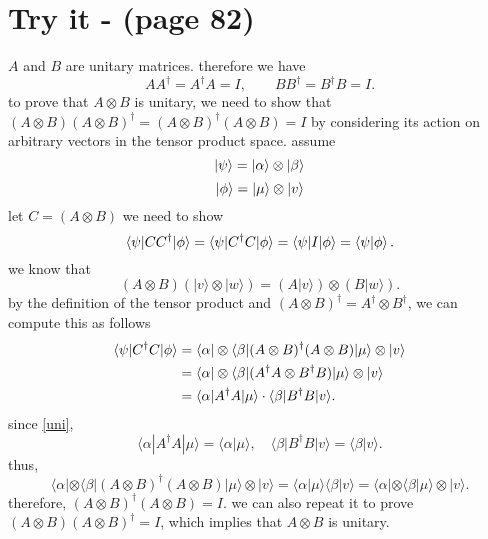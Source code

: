 \documentclass[12pt]{article}
\begin{document}
\section*{Try it - (page 82)}
\( A \) and \( B \) are unitary matrices. therefore we have
\begin{equation}
   \label{uni}
   A A^\dagger = A^\dagger A = I, \quad \quad B B^\dagger = B^\dagger B = I.   
\end{equation}
to prove that \( A \otimes B \) is unitary, we need to show that \( (A \otimes B) (A \otimes B)^\dagger = (A \otimes B)^\dagger (A \otimes B) = I \) by considering its action on arbitrary vectors in the tensor product space. 
assume
\begin{equation*}
\ket{\psi} = \ket{\alpha} \otimes \ket{\beta}
\end{equation*}
\begin{equation*}
\ket{\phi} = \ket{\mu} \otimes \ket{v}
\end{equation*}
let \( C = (A \otimes B) \) we need to show
\begin{equation*}
   \braket{\psi | C C^\dagger | \phi} = \braket{\psi | C^\dagger C | \phi} = \braket{\psi | I | \phi} = \braket{\psi | \phi}.
\end{equation*}
we know that
\[
(A \otimes B)(|v\rangle \otimes |w\rangle) = (A|v\rangle) \otimes (B|w\rangle).
\]
by the definition of the tensor product and \( (A \otimes B)^\dagger = A^\dagger \otimes B^\dagger \), we can compute this as follows
\begin{align*}
   \braket{\psi | C^\dagger C | \phi} &= \langle \alpha | \otimes \langle \beta | (A \otimes B)^\dagger (A \otimes B) | \mu \rangle \otimes | v \rangle \\
   &= \langle \alpha | \otimes \langle \beta | ( A^\dagger A \otimes B^\dagger B) | \mu \rangle \otimes | v \rangle   \\
   &= \langle \alpha | A^\dagger A | \mu \rangle \cdot \langle \beta | B^\dagger B | v \rangle.   
\end{align*}
since \ref{uni},
\[
\langle \alpha | A^\dagger A | \mu \rangle = \langle \alpha | \mu \rangle, \quad \langle \beta | B^\dagger B | v \rangle = \langle \beta | v \rangle.
\]
thus,
\[
   \langle \alpha | \otimes \langle \beta | (A \otimes B)^\dagger (A \otimes B) | \mu \rangle \otimes | v \rangle = \langle \alpha | \mu \rangle \langle \beta | v \rangle  = \langle \alpha | \otimes \langle \beta | \mu \rangle \otimes | v \rangle.
\]
therefore, \( (A \otimes B)^\dagger (A \otimes B) = I \). we can also repeat it to prove \( (A \otimes B) (A \otimes B)^\dagger = I \),  which implies that \( A \otimes B \) is unitary.
\end{document}
